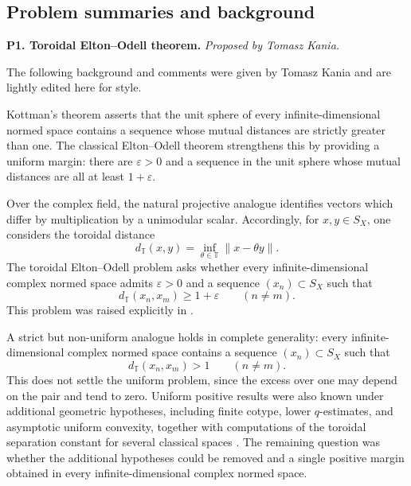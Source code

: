 \documentclass[11pt,reqno]{amsart}
\theoremstyle{plain}
\theoremstyle{definition}
\newcommand{\T}{\mathbb T}
\newcommand{\distT}{d_{\mathbb T}}
\begin{document}
\subsection*{Problem summaries and background}

\noindent\textbf{P1. Toroidal Elton--Odell theorem.} \emph{Proposed by Tomasz Kania.} 

The following background and comments were given by Tomasz Kania and are lightly edited here for style.

Kottman's theorem asserts that the unit sphere of every infinite-dimensional normed space contains a sequence whose mutual distances are strictly greater than one. The classical Elton--Odell theorem strengthens this by providing a uniform margin: there are $\varepsilon>0$ and a sequence in the unit sphere whose mutual distances are all at least $1+\varepsilon$.

Over the complex field, the natural projective analogue identifies vectors which differ by multiplication by a unimodular scalar. Accordingly, for $x,y\in S_X$, one considers the toroidal distance
\begin{equation*}
    \distT(x,y)=\inf_{\theta\in\T}\|x-\theta y\|.
\end{equation*}
The toroidal Elton--Odell problem asks whether every infinite-dimensional complex normed space admits $\varepsilon>0$ and a sequence $(x_n)\subset S_X$ such that
\begin{equation*}
    \distT(x_n,x_m)\geq 1+\varepsilon
    \qquad(n\ne m).
\end{equation*}
This problem was raised explicitly in \cite[\S5.3.1]{HajekKaniaRusso2018}.

A strict but non-uniform analogue holds in complete generality: every infinite-dimensional complex normed space contains a sequence $(x_n)\subset S_X$ such that
\begin{equation*}
    \distT(x_n,x_m)>1
    \qquad(n\ne m).
\end{equation*}
This does not settle the uniform problem, since the excess over one may depend on the pair and tend to zero. Uniform positive results were also known under additional geometric hypotheses, including finite cotype, lower $q$-estimates, and asymptotic uniform convexity, together with computations of the toroidal separation constant for several classical spaces \cite{Kania2026Toroidal}. The remaining question was whether the additional hypotheses could be removed and a single positive margin obtained in every infinite-dimensional complex normed space.
\end{document}
